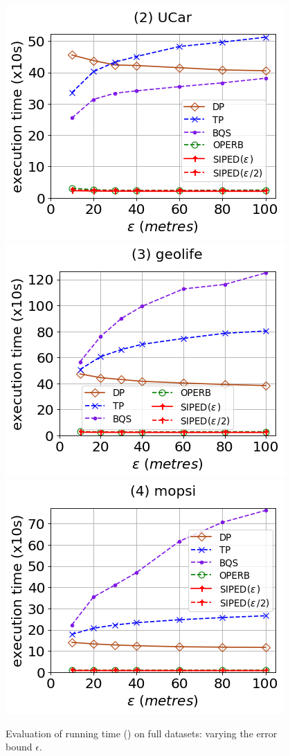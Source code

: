 \begin{figure}[tb!]
	\centering
	\includegraphics[scale=0.320]{Figures/Exp-PED-time-epsilon-service.png}	\hspace{3ex}
	\includegraphics[scale=0.320]{Figures/Exp-PED-time-epsilon-geolife.png}	\hspace{3ex}
	\includegraphics[scale=0.320]{Figures/Exp-PED-time-epsilon-mopsi.png}	
	\vspace{-2ex}
	\caption{\small Evaluation of running time (\ped) on full datasets: varying the error bound $\epsilon$.}\label{fig:time-epsilon-ped}
	\vspace{-2ex}
\end{figure}

